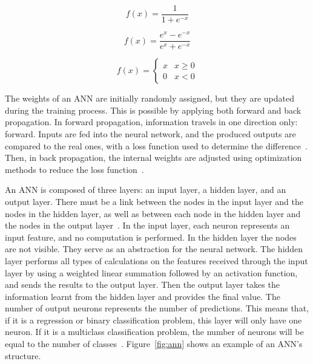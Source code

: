     
    \begin{equation}\label{eq:1}
        f(x) = \frac{1}{1+e^{-x}}
    \end{equation}
    
    \begin{equation}\label{eq:2}
        f(x) = \frac{e^{x}-e^{-x}}{e^{x}+e^{-x}}
    \end{equation}
    
    \begin{equation} \label{eq:3}
        f(x) = \begin{cases}x & x \geq 0\\0 & x < 0\end{cases}
    \end{equation}
    
    The weights of an \gls{ANN} are initially randomly assigned, but they are updated during the training process. This is possible by applying both forward and back propagation. In forward propagation, information travels in one direction only: forward. Inputs are fed into the neural network, and the produced outputs are compared to the real ones, with a loss function used to determine the difference~\cite{Farizawani2020AApproaches}. Then, in back propagation, the internal weights are adjusted using optimization methods to reduce the loss function~\cite{Kim2021CBP:Method}. 
    
    An \gls{ANN} is composed of three layers: an input layer, a hidden layer, and an output layer. There must be a link between the nodes in the input layer and the nodes in the hidden layer, as well as between each node in the hidden layer and the nodes in the output layer~\cite{Imran2019AClassification}. In the input layer, each neuron represents an input feature, and no computation is performed. In the hidden layer the nodes are not visible. They serve as an abstraction for the neural network. The hidden layer performs all types of calculations on the features received through the input layer by using a weighted linear summation followed by an activation function, and sends the results to the output layer. Then the output layer takes the information learnt from the hidden layer and provides the final value. The number of output neurons represents the number of predictions. This means that, if it is a regression or binary classification problem, this layer will only have one neuron. If it is a multiclass classification problem, the number of neurons will be equal to the number of classes~\cite{Alaloul2020DataNetworks}. Figure~\ref{fig:ann} shows an example of an \gls{ANN}'s structure.
    
